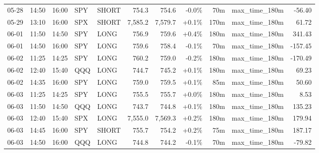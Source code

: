 \documentclass[11pt,a4paper,twoside]{article}
\begin{document}
\begin{center}
\begin{longtable}{>{\color{txtmain}}l l l l l r r r r >{\color{txtmain}}l r}
05-28 & 14:50 & 16:00 & SPY & SHORT & 754.3 & 754.6 & \textcolor{lossred}{-0.0\%} & 70m & max\_time\_180m & \textcolor{lossred}{-56.40} \\
05-29 & 13:10 & 16:00 & SPX & SHORT & 7,585.2 & 7,579.7 & \textcolor{wingreen}{+0.1\%} & 170m & max\_time\_180m & \textcolor{wingreen}{61.72} \\
06-01 & 11:50 & 14:50 & SPY & LONG & 756.9 & 759.6 & \textcolor{wingreen}{+0.4\%} & 180m & max\_time\_180m & \textcolor{wingreen}{341.43} \\
06-01 & 14:50 & 16:00 & SPY & LONG & 759.6 & 758.4 & \textcolor{lossred}{-0.1\%} & 70m & max\_time\_180m & \textcolor{lossred}{-157.45} \\
06-02 & 11:25 & 14:25 & SPY & LONG & 760.2 & 759.0 & \textcolor{lossred}{-0.2\%} & 180m & max\_time\_180m & \textcolor{lossred}{-170.49} \\
06-02 & 12:40 & 15:40 & QQQ & LONG & 744.7 & 745.2 & \textcolor{wingreen}{+0.1\%} & 180m & max\_time\_180m & \textcolor{wingreen}{69.23} \\
06-02 & 14:35 & 16:00 & SPY & LONG & 759.0 & 759.5 & \textcolor{wingreen}{+0.1\%} & 85m & max\_time\_180m & \textcolor{wingreen}{50.60} \\
06-03 & 11:25 & 14:25 & SPY & LONG & 755.5 & 755.7 & \textcolor{wingreen}{+0.0\%} & 180m & max\_time\_180m & \textcolor{wingreen}{8.53} \\
06-03 & 11:50 & 14:50 & QQQ & LONG & 743.7 & 744.8 & \textcolor{wingreen}{+0.1\%} & 180m & max\_time\_180m & \textcolor{wingreen}{135.23} \\
06-03 & 12:40 & 15:40 & SPX & LONG & 7,555.0 & 7,569.3 & \textcolor{wingreen}{+0.2\%} & 180m & max\_time\_180m & \textcolor{wingreen}{179.94} \\
06-03 & 14:45 & 16:00 & SPY & SHORT & 755.7 & 754.2 & \textcolor{wingreen}{+0.2\%} & 75m & max\_time\_180m & \textcolor{wingreen}{187.17} \\
06-03 & 14:50 & 16:00 & QQQ & LONG & 744.8 & 744.2 & \textcolor{lossred}{-0.1\%} & 70m & max\_time\_180m & \textcolor{lossred}{-79.82} \\
\end{longtable}
\end{center}
\clearpage
\end{document}
